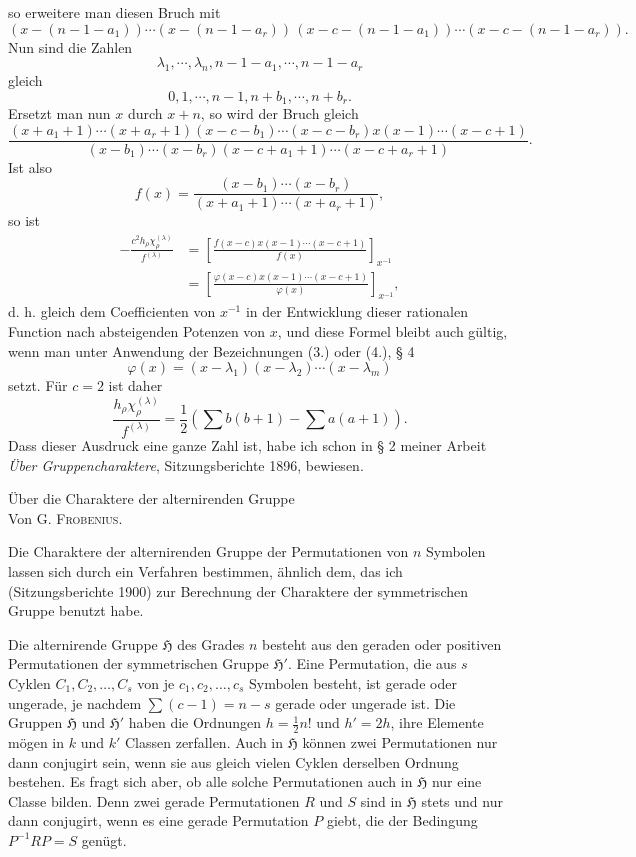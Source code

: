 \documentclass[11pt]{article}
\newcommand{\Hgr}{\mathfrak{H}}
\newcommand{\frobtitle}[1]{\begin{center}{\Large #1}\\[0.75em]Von G. \textsc{Frobenius}.\end{center}\vspace{0.5em}}
\begin{document}
so erweitere man diesen Bruch mit
\[
 (x-(n-1-a_1))\cdots(x-(n-1-a_r))\,(x-c-(n-1-a_1))\cdots(x-c-(n-1-a_r)).
\]
Nun sind die Zahlen
\[
 \lambda_1,
\cdots,
\lambda_n,
 n-1-a_1,
\cdots,n-1-a_r
\]
gleich
\[
 0,1,
\cdots,n-1,
 n+b_1,
\cdots,n+b_r.
\]
Ersetzt man nun $x$ durch $x+n$, so wird der Bruch gleich
\[
 \frac{(x+a_1+1)\cdots(x+a_r+1)(x-c-b_1)\cdots(x-c-b_r)x(x-1)\cdots(x-c+1)}{(x-b_1)\cdots(x-b_r)(x-c+a_1+1)\cdots(x-c+a_r+1)}.
\]
Ist also
\begin{equation}\tag{13.}
 f(x)=\frac{(x-b_1)\cdots(x-b_r)}{(x+a_1+1)\cdots(x+a_r+1)},
\end{equation}
so ist
\begin{equation}\tag{14.}
\begin{aligned}
 -\frac{c^2h_\rho\chi_\rho^{(\lambda)}}{f^{(\lambda)}}
 &=\left[\frac{f(x-c)x(x-1)\cdots(x-c+1)}{f(x)}\right]_{x^{-1}}\\
 &=\left[\frac{\varphi(x-c)x(x-1)\cdots(x-c+1)}{\varphi(x)}\right]_{x^{-1}},
\end{aligned}
\end{equation}
d. h. gleich dem Coefficienten von $x^{-1}$ in der Entwicklung dieser rationalen Function nach absteigenden Potenzen von $x$, und diese Formel bleibt auch gültig, wenn man unter Anwendung der Bezeichnungen (3.) oder (4.), § 4
\begin{equation}\tag{15.}
 \varphi(x)=(x-
\lambda_1)(x-
\lambda_2)\cdots(x-
\lambda_m)
\end{equation}
setzt. Für $c=2$ ist daher
\begin{equation}\tag{16.}
 \frac{h_\rho\chi_\rho^{(\lambda)}}{f^{(\lambda)}}=\frac12\left(\sum b(b+1)-\sum a(a+1)\right).
\end{equation}
Dass dieser Ausdruck eine ganze Zahl ist, habe ich schon in § 2 meiner Arbeit \emph{Über Gruppencharaktere}, Sitzungsberichte 1896, bewiesen.

\clearpage

\frobtitle{Über die Charaktere der alternirenden Gruppe}

Die Charaktere der alternirenden Gruppe der Permutationen von $n$ Symbolen lassen sich durch ein Verfahren bestimmen, ähnlich dem, das ich (Sitzungsberichte 1900) zur Berechnung der Charaktere der symmetrischen Gruppe benutzt habe.

Die alternirende Gruppe $\Hgr$ des Grades $n$ besteht aus den geraden oder positiven Permutationen der symmetrischen Gruppe $\Hgr'$. Eine Permutation, die aus $s$ Cyklen $C_1,C_2,\ldots,C_s$ von je $c_1,c_2,\ldots,c_s$ Symbolen besteht, ist gerade oder ungerade, je nachdem $\sum(c-1)=n-s$ gerade oder ungerade ist. Die Gruppen $\Hgr$ und $\Hgr'$ haben die Ordnungen $h=\frac12 n!$ und $h'=2h$, ihre Elemente mögen in $k$ und $k'$ Classen zerfallen. Auch in $\Hgr$ können zwei Permutationen nur dann conjugirt sein, wenn sie aus gleich vielen Cyklen derselben Ordnung bestehen. Es fragt sich aber, ob alle solche Permutationen auch in $\Hgr$ nur eine Classe bilden. Denn zwei gerade Permutationen $R$ und $S$ sind in $\Hgr$ stets und nur dann conjugirt, wenn es eine gerade Permutation $P$ giebt, die der Bedingung $P^{-1}RP=S$ genügt.
\end{document}
